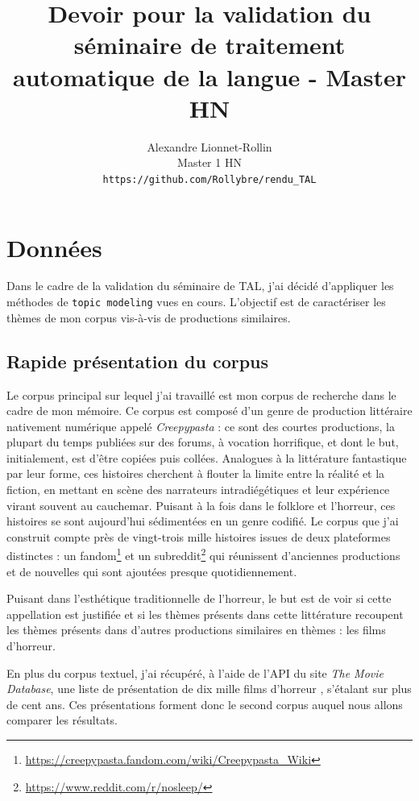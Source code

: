 \documentclass[a4paper,12pt,onecolumn,oneside]{article}
\author{Alexandre Lionnet-Rollin \\ Master 1 HN \\ \texttt{https://github.com/Rollybre/rendu\_TAL}}
\title{Devoir pour la validation du séminaire de traitement automatique de la langue - Master HN}
\begin{document}
\maketitle
\bigskip

\section{Données}
Dans le cadre de la validation du séminaire de TAL, j'ai décidé d'appliquer les méthodes de \texttt{topic modeling} vues en cours. L'objectif est de caractériser les thèmes de mon corpus vis-à-vis de productions similaires.

\subsection{Rapide présentation du corpus}
Le corpus principal sur lequel j'ai travaillé est mon corpus de recherche dans le cadre de mon mémoire. Ce corpus est composé d'un genre de production littéraire nativement numérique appelé \emph{Creepypasta} : ce sont des courtes productions, la plupart du temps publiées sur des forums, à vocation horrifique, et dont le but, initialement, est d'être copiées puis collées. Analogues à la littérature fantastique par leur forme, ces histoires cherchent à flouter la limite entre la réalité et la fiction, en mettant en scène des narrateurs intradiégétiques et leur expérience virant souvent au cauchemar. Puisant à la fois dans le folklore et l'horreur, ces histoires se sont aujourd'hui sédimentées en un genre codifié.
Le corpus que j'ai construit compte près de vingt-trois mille histoires issues de deux plateformes distinctes : un fandom\footnote{\url{https://creepypasta.fandom.com/wiki/Creepypasta_Wiki}} et un subreddit\footnote{\url{https://www.reddit.com/r/nosleep/}} qui réunissent d'anciennes productions et de nouvelles qui sont ajoutées presque quotidiennement. 

Puisant dans l'esthétique traditionnelle de l'horreur, le but est de voir si cette appellation est justifiée et si les thèmes présents dans cette littérature recoupent les thèmes présents dans d'autres productions similaires en thèmes : les films d'horreur. 

En plus du corpus textuel, j'ai récupéré, à l'aide de l'API du site \emph{The Movie Database}, une liste de présentation de dix mille films d'horreur , s'étalant sur plus de cent ans. Ces présentations forment donc le second corpus auquel nous allons comparer les résultats.
\end{document}
